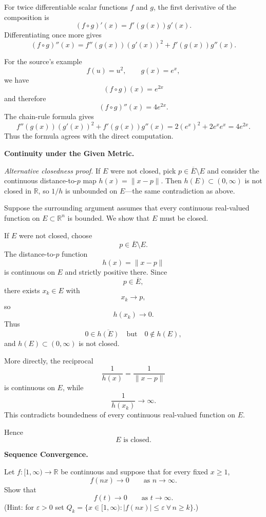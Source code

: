 \begin{solution}
For twice differentiable scalar functions \(f\) and \(g\),
the first derivative of the composition is
\[
(f\circ g)'(x)
=
f'(g(x))g'(x).
\]
Differentiating once more gives
\[
\boxed{
(f\circ g)''(x)
=
f''(g(x))(g'(x))^2
+
f'(g(x))g''(x).
}
\]

For the source's example
\[
f(u)=u^2,
\qquad
g(x)=e^x,
\]
we have
\[
(f\circ g)(x)=e^{2x}
\]
and therefore
\[
(f\circ g)''(x)=4e^{2x}.
\]
The chain-rule formula gives
\[
f''(g(x))(g'(x))^2
+
f'(g(x))g''(x)
=
2(e^x)^2
+
2e^x e^x
=
4e^{2x}.
\]
Thus the formula agrees with the direct computation.
\end{solution}


\begin{problem}[CP-II-0339]
\label{prob:cp-ii-0339}
\textbf{Continuity under the Given Metric.}

\hspace*{1.5em}\emph{Alternative closedness proof.}
	If $E$ were not closed, pick $p\in\overline E\setminus E$ and consider the continuous
	distance-to-$p$ map $h(x)=\|x-p\|$. Then $h(E)\subset(0,\infty)$ is not closed in $\mathbb R$,
	so $1/h$ is unbounded on $E$---the same contradiction as above.
\end{problem}

\begin{solution}
Suppose the surrounding argument assumes that every continuous real-valued function on
\(E\subset\mathbb R^n\) is bounded. We show that \(E\) must be closed.

If \(E\) were not closed, choose
\[
p\in\overline E\setminus E.
\]
The distance-to-\(p\) function
\[
h(x)=\|x-p\|
\]
is continuous on \(E\) and strictly positive there. Since
\[
p\in\overline E,
\]
there exists \(x_k\in E\) with
\[
x_k\to p,
\]
so
\[
h(x_k)\to0.
\]
Thus
\[
0\in\overline{h(E)}
\quad\text{but}\quad
0\notin h(E),
\]
and \(h(E)\subset(0,\infty)\) is not closed.

More directly, the reciprocal
\[
\frac1{h(x)}
=
\frac1{\|x-p\|}
\]
is continuous on \(E\), while
\[
\frac1{h(x_k)}\to\infty.
\]
This contradicts boundedness of every continuous real-valued function on \(E\).

Hence
\[
\boxed{E\text{ is closed}.}
\]
\end{solution}


\begin{problem}[CP-II-0341]
\label{prob:cp-ii-0341}
\textbf{Sequence Convergence.}

	Let $f:[1,\infty)\to\mathbb{R}$ be continuous and suppose that for every fixed $x\ge1$,
	\[
	f(nx)\longrightarrow 0 \qquad\text{as }n\to\infty .
	\]
	Show that
	\[
	f(t)\longrightarrow 0 \qquad\text{as }t\to\infty .
	\]
	(Hint: for $\varepsilon>0$ set $Q_k=\{x\in[1,\infty): |f(nx)|\le\varepsilon\ \forall\,n\ge k\}$.)
\end{problem}

